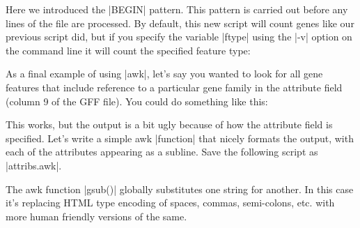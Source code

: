 \documentclass[10pt,letterpaper]{article}
\begin{document}
Here we introduced the |BEGIN| pattern. This pattern is carried out before any lines of the file are processed.  By default, this new script will count genes like our previous script did, but if you specify the variable |ftype| using the |-v| option on the command line it will count the specified feature type:


As a final example of using |awk|, let's say you wanted to look for all gene features that include reference to a particular gene family in the attribute field (column 9 of the GFF file). You could do something like this:


This works, but the output is a bit ugly because of how the attribute field is specified. Let's write a simple awk |function| that nicely formats the output, with each of the attributes appearing as a subline. Save the following script as |attribs.awk|.


The awk function |gsub()| globally substitutes one string for another. In this case it's replacing HTML type encoding of spaces, commas, semi-colons, etc. with more human friendly versions of the same.
\end{document}
